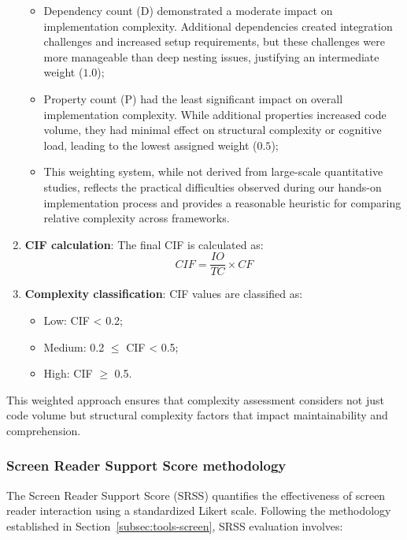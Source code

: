 \begin{enumerate}
    \begin{itemize}
        \item Dependency count (D) demonstrated a moderate impact on implementation complexity. Additional dependencies created integration challenges and increased setup requirements, but these challenges were more manageable than deep nesting issues, justifying an intermediate weight ($1.0$);

        \item Property count (P) had the least significant impact on overall implementation complexity. While additional properties increased code volume, they had minimal effect on structural complexity or cognitive load, leading to the lowest assigned weight ($0.5$);

        \item This weighting system, while not derived from large-scale quantitative studies, reflects the practical difficulties observed during our hands-on implementation process and provides a reasonable heuristic for comparing relative complexity across frameworks.
    \end{itemize}

    \item \textbf{CIF calculation}: The final CIF is calculated as:
    \begin{equation}
    CIF = \frac{IO}{TC} \times CF
    \end{equation}
    
    \item \textbf{Complexity classification}: CIF values are classified as:
    \begin{itemize}
        \item Low: CIF < 0.2;
        \item Medium: 0.2 $\leq$ CIF < 0.5;
        \item High: CIF $\geq$ 0.5.
    \end{itemize}
\end{enumerate}

This weighted approach ensures that complexity assessment considers not just code volume but structural complexity factors that impact maintainability and comprehension.

\subsubsection{Screen Reader Support Score methodology}
\label{subsubsec:srss-methodology}

The Screen Reader Support Score (SRSS) quantifies the effectiveness of screen reader interaction using a standardized Likert scale. Following the methodology established in Section~\ref{subsec:tools-screen}, SRSS evaluation involves:

